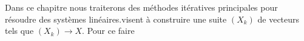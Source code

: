 \chapter*{}
Dans ce chapitre nous traiterons des méthodes itératives principales pour résoudre des systèmes linéaires.visent à construire une suite \((X_k)\) de vecteurs tels que \((X_k) \rightarrow X\). Pour ce faire 

\subsection*{}
\subsection*{}
\subsection*{}
